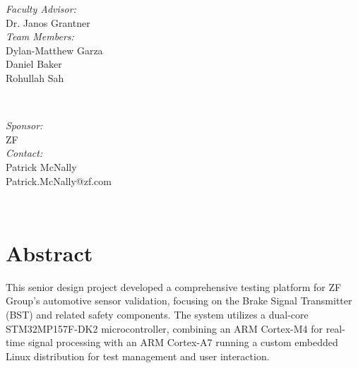 \documentclass[12pt]{article}
\begin{document}
\begin{titlepage}

  \begin{minipage}{0.4\textwidth}
    \begin{flushleft} \large
      \emph{Faculty Advisor:}\\
      Dr. Janos Grantner\\ [.25cm]
      \emph{Team Members:}\\
      Dylan-Matthew Garza\\
      Daniel Baker\\
      Rohullah Sah
    \end{flushleft}
  \end{minipage}
  ~
  \begin{minipage}{0.4\textwidth}
    \begin{flushright} \large
      \emph{Sponsor:} \\
      ZF
      \\\emph{Contact:}\\
      Patrick McNally\\ 
      Patrick.McNally@zf.com
    \end{flushright}
  \end{minipage}\\[1cm]


  \begin{flushleft} \large
  \end{flushleft}

  \vfill 

\end{titlepage}
\onehalfspacing
\tableofcontents
\newpage

\section{Abstract}


This senior design project developed a comprehensive testing platform for ZF Group's 
automotive sensor validation, focusing on the Brake Signal Transmitter (BST) and 
related safety components. The system utilizes a dual-core STM32MP157F-DK2 
microcontroller, combining an ARM Cortex-M4 for real-time signal processing with 
an ARM Cortex-A7 running a custom embedded Linux distribution for test management 
and user interaction.
\end{document}
